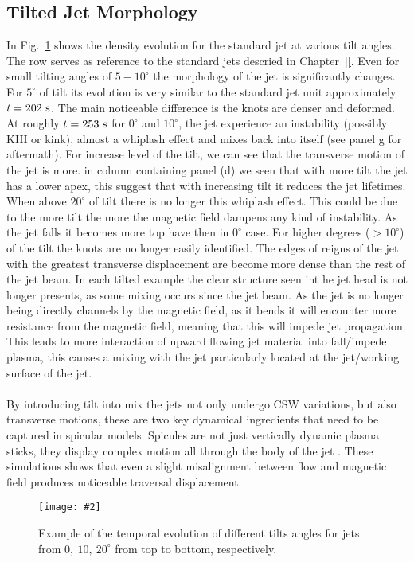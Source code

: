 \documentclass[12pt]{ociamthesis}
\newcommand{\mfig}[4]{
  \begin{figure}
  \begin{center}
  \texttt{[image: \#2]}
  \caption{#3}
  \label{#4}
  \end{center}
  \end{figure}}
\newcommand{\np}{\\ \\}
\begin{document}
\subsection{Tilted Jet Morphology}
\label{subsec:steady}
In Fig.~\ref{tj_morph} shows the density evolution for the standard jet at various tilt angles. The row serves as reference to the standard jets descried in Chapter~\ref{}. Even for small tilting angles of $5-10^{\circ}$ the morphology of the jet is significantly changes. For $5^{\circ}$ of tilt its evolution is very similar to the standard jet unit approximately $t=202~\rm{s}$. The main noticeable difference is the knots are denser and deformed. At roughly $t=253~\rm{s}$ for $0^{\circ}$ and $10^{\circ}$, the jet experience an instability (possibly KHI or kink), almost a whiplash effect and mixes back into itself (see panel g for aftermath). For increase level of the tilt, we can see that the transverse motion of the jet is more. in column containing panel (d) we seen that with more tilt the jet has a lower apex, this suggest that with increasing tilt it reduces the jet lifetimes. When above $20^{\circ}$ of tilt there is no longer this whiplash effect. This could be due to the more tilt the more the magnetic field dampens any kind of instability. As the jet falls it becomes more top have then in $0^{\circ}$ case. For higher degrees ($> 10^{\circ}$) of the tilt the knots are no longer easily identified. The edges of reigns of the jet with the greatest transverse displacement are become more dense than the rest of the jet beam. In each tilted example the clear structure seen int he jet head is not longer presents, as some mixing occurs since the jet beam. As the jet is no longer being directly channels by the magnetic field, as it bends it will encounter more resistance from the magnetic field, meaning that this will impede jet propagation. This leads to more interaction of upward flowing jet material into fall/impede plasma, this causes a mixing with the jet particularly located at the jet/working surface of the jet. \np
By introducing tilt into mix the jets not only undergo CSW variations, but also transverse motions, these are two key dynamical ingredients that need to be captured in spicular models. Spicules are not just vertically dynamic plasma sticks, they display complex motion all through the body of the jet \citep{Sharma2018ApJ85361S}. These simulations shows that even a slight misalignment between flow and magnetic field produces noticeable traversal displacement.       
\mfig{1}{figures/tj_den_plot_1.png}{Example of the temporal evolution of different tilts angles for jets from $0,~10,~20^{\circ}$ from top to bottom, respectively.}{tj_morph}
\end{document}
